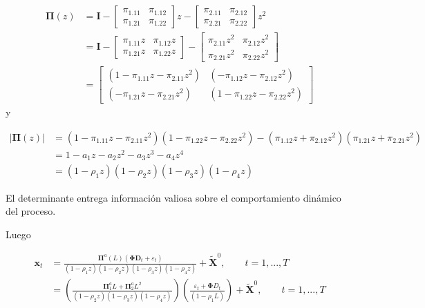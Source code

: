 \documentclass[12pt, twoside]{book}\usepackage[]{graphicx}\usepackage[]{color}
\numberwithin{equation}{section}
\numberwithin{theorem}{section}
\numberwithin{teorema}{section}
\numberwithin{defi}{section}
\numberwithin{prop}{section}
\numberwithin{defi}{section}
\theoremstyle{plain}
\begin{document}
\begin{align}
\mathbf{\Pi}(z) & = \mathbf{I}-\left[\begin{array}{cc} 
\pi_{1.11} & \pi_{1.12} \\
\pi_{1.21} & \pi_{1.22}
\end{array}\right]z- \left[\begin{array}{cc} 
\pi_{2.11} & \pi_{2.12} \\
\pi_{2.21} & \pi_{2.22}
\end{array}\right]z^{2} \\
              & = \mathbf{I}-\left[\begin{array}{cc} 
\pi_{1.11}z & \pi_{1.12}z \\
\pi_{1.21}z & \pi_{1.22}z
\end{array}\right]- \left[\begin{array}{cc} 
\pi_{2.11}z^{2} & \pi_{2.12}z^{2} \\
\pi_{2.21}z^{2} & \pi_{2.22}z^{2}
\end{array}\right] \\
 & = \left[\begin{array}{cc} (1-\pi_{1.11}z-\pi_{2.11}z^{2}) & (-\pi_{1.12}z-\pi_{2.12}z^{2}) \\ 
 (-\pi_{1.21}z-\pi_{2.21}z^{2}) & (1-\pi_{1.22}z-\pi_{2.22}z^{2})
 \end{array}\right]
\end{align}
y 

\begin{align}
|\boldsymbol{\Pi}(z)| & = (1-\pi_{1.11}z-\pi_{2.11}z^{2})(1-\pi_{1.22}z-\pi_{2.22}z^{2})-(\pi_{1.12}z+\pi_{2.12}z^{2})(\pi_{1.21}z+\pi_{2.21}z^{2}) \\ 
& = 1-a_{1}z-a_{2}z^{2}-a_{3}z^{3}-a_{4}z^{4} \\ 
& = (1-\rho_{1}z)(1-\rho_{2}z)(1-\rho_{3}z)(1-\rho_{4}z)
\end{align}

El determinante entrega información valiosa sobre el comportamiento dinámico del proceso. 

Luego 

\begin{align}
\mathbf{x}_{t} & = \frac{\boldsymbol{\Pi}^{a}(L)(\boldsymbol{\Phi}\mathbf{D}_{t}+\varepsilon_{t})}{(1-\rho_{1}z)(1-\rho_{2}z)(1-\rho_{3}z)(1-\rho_{4}z)}+\tilde{\mathbf{X}}^{0}, \qquad t=1,...,T \\ 
& = \left(\frac{\mathbf{\Pi}_{1}^{a}L+\mathbf{\Pi}^{a}_{2}L^{2}}{(1-\rho_{2}z)(1-\rho_{3}z)(1-\rho_{4}z)}\right)\left(\frac{\varepsilon_{t}+\mathbf{\Phi}D_{t}}{(1-\rho_{1}L)}\right)+\mathbf{\tilde{X}}^{0}, \qquad t=1,...,T
\end{align}
\end{document}
